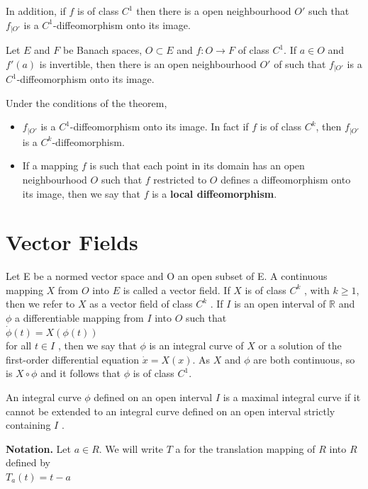 \documentclass[12 pt]{article}
\theoremstyle{definition}
\theoremstyle{remark}
\newcommand{\R}{\mathbb{R}}
\begin{document}
In addition, if $f$ is of class $C^1$ then there is a open neighbourhood $O'$ such that $f_{|O'}$ is a $C^1$-diffeomorphism onto its image.

\theorem Let $E$ and $F$ be Banach spaces, $O \subset E$ and $f : O \to F$ of class $C^1$. If $a \in O$ and $f'(a)$ is invertible, then there is an open neighbourhood $O'$ of such that $f_{ |O'}$ is a $C^1$-diffeomorphism onto its image.

\remark Under the conditions of the theorem, 
\begin{itemize}
\item $f_{ |O'}$ is a $C^1$-diffeomorphism onto its image. In fact if $f$ is of class $C^k$, then $f_{ |O'}$ is a $C^k$-diffeomorphism.

\item If a mapping $f$ is such that each point in its domain has an open neighbourhood
$O$ such that $f$ restricted to $O$ defines a diffeomorphism onto its image, then we
say that $f$ is a \textbf{local diffeomorphism}.
\end{itemize}
\normalfont
\section{Vector Fields}
Let E be a normed vector space and O an open subset of E. A continuous mapping $X$ from $O$ into $E$ is called a vector field. If $X$ is of class $C^k$ , with $k \geq 1$, then
we refer to $X$ as a vector field of class $C^k$ . If $I$ is an open interval of $\R$ and $\phi$ a differentiable mapping from $I$ into $O$ such that\\
\hspace*{5cm} $\dot{\phi}(t) = X(\phi (t))$\\

for all $t \in  I$ , then we say that $\phi$ is an integral curve of $X$ or a solution of the first-order differential equation $\dot{x}= X(x)$. As $X$ and $\phi$ are both continuous, so is $X \circ \phi$
and it follows that $\phi$ is of class $C^1$.

An integral curve $\phi$ defined on an open interval $I$ is a maximal integral curve if it cannot be extended to an integral curve defined
on an open interval strictly containing $I$ .

\textbf{Notation.} Let $a \in R$. We will write $T$ a for the translation mapping of $R$ into $R$ defined by\\
\hspace*{4cm} $T_a(t) =  t-a$
\end{document}
